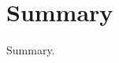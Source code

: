 \documentclass[A4]{article}
\begin{document}
\section{Summary}
\label{summary}
Summary.

\nocite{robotron,
stonx,vice,650sim,herculessim,zib,4004,thermal1,thermal2,rojas}




\end{document}
